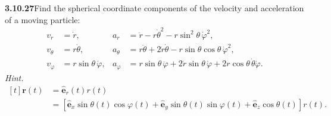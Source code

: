 \par\bigskip
\noindent\textbf{3.10.27}\quad Find the spherical coordinate components of the
velocity and acceleration of a moving particle:
\[
\begin{aligned}
v_{r}&=\dot{r},&a_{r}&=\ddot{r}-r\dot{\theta}^{2}
-r\sin^{2}\theta\,\dot{\varphi}^{2},\\
v_{\theta}&=r\dot{\theta},&a_{\theta}&=r\ddot{\theta}+2\dot{r}\dot{\theta}
-r\sin\theta\cos\theta\,\dot{\varphi}^{2},\\
v_{\varphi}&=r\sin\theta\,\dot{\varphi},&a_{\varphi}&=r\sin\theta\,
\ddot{\varphi}+2\dot{r}\sin\theta\,\dot{\varphi}
+2r\cos\theta\,\dot{\theta}\dot{\varphi}.
\end{aligned}
\]
\emph{Hint.}\quad
$\begin{aligned}[t]
\mathbf{r}(t)&=\hat{\mathbf{e}}_{r}(t)r(t)\\
&=[\hat{\mathbf{e}}_{x}\sin\theta(t)\cos\varphi(t)
+\hat{\mathbf{e}}_{y}\sin\theta(t)\sin\varphi(t)
+\hat{\mathbf{e}}_{z}\cos\theta(t)]r(t).
\end{aligned}$

